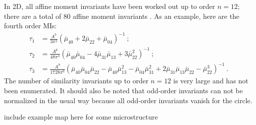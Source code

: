In 2D, all affine moment invariants have been worked out up to order $n=12$; there are a total of $80$ affine moment invariants \cite{Flusser2009}. As an example, here are the fourth order MIs:
\begin{equation}
\begin{split}
\tau_1 &= \frac{A^3}{3\pi^2}\left(\bar{\mu}_{40}+2\bar{\mu}_{22}+\bar{\mu}_{04}\right)^{-1}\ ;\\
\tau_2 &= \frac{A^6}{48\pi^4}\left(\bar{\mu}_{40}\bar{\mu}_{04}-4\bar{\mu}_{31}\bar{\mu}_{13}+3\bar{\mu}^2_{22}\right)^{-1}\ ;\\
\tau_3 &= \frac{A^9}{1728\pi^6}\left(\bar{\mu}_{40}\bar{\mu}_{04}\bar{\mu}_{22}-\bar{\mu}_{40}\bar{\mu}^2_{13}-\bar{\mu}_{04}\bar{\mu}^2_{31}+
2\bar{\mu}_{31}\bar{\mu}_{13}\bar{\mu}_{22}-\bar{\mu}^3_{22}\right)^{-1}\ .
\end{split}
\end{equation}
The number of similarity invariants up to order $n=12$ is very large and has not been enumerated.  It should also be noted that odd-order invariants can not be normalized in the usual way because all odd-order invariants vanish for the circle.


{\color{red}include example map here for some microstructure}





